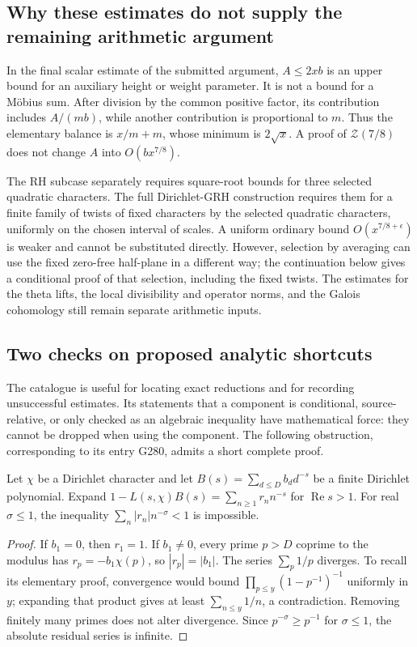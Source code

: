 \subsection{Why these estimates do not supply the remaining arithmetic argument}

In the final scalar estimate of the submitted argument,\cite{alpo-final-scalar}
$A\le2xb$ is an upper bound for an auxiliary height or
weight parameter. It is not a bound for a M\"obius sum.
After division by the common positive factor, its contribution
includes $A/(mb)$, while another contribution is proportional
to $m$. Thus the elementary balance is $x/m+m$, whose
minimum is $2\sqrt{x}$. A proof of
$\mathcal Z(7/8)$ does not change $A$ into
$O(bx^{7/8})$.

The RH subcase separately requires square-root bounds for
three selected quadratic characters. The full Dirichlet-GRH
construction requires them for a finite family of twists of
fixed characters by the selected quadratic characters, uniformly
on the chosen interval of scales. A uniform ordinary bound
$O(x^{7/8+\epsilon})$ is weaker and cannot be substituted
directly. However, selection by averaging can use the fixed
zero-free half-plane in a different way; the continuation below
gives a conditional proof of that selection, including the fixed
twists. The estimates for the theta lifts, the local divisibility
and operator norms, and the Galois cohomology still remain
separate arithmetic inputs.

\subsection{Two checks on proposed analytic shortcuts}

The catalogue is useful for locating exact reductions and
for recording unsuccessful estimates.\cite{qrh-catalogue} Its statements that
a component is conditional, source-relative, or only checked
as an algebraic inequality have mathematical force: they
cannot be dropped when using the component. The following
obstruction, corresponding to its entry G280, admits a
short complete proof.

\begin{proposition}
\label{prop:qrh-absolute-obstruction}
Let $\chi$ be a Dirichlet character and let
$B(s)=\sum_{d\le D}b_d d^{-s}$ be a finite Dirichlet
polynomial. Expand
$1-L(s,\chi)B(s)=\sum_{n\ge1}r_n n^{-s}$ for
$\operatorname{Re}s>1$. For real $\sigma\le1$, the
inequality $\sum_n|r_n|n^{-\sigma}<1$ is impossible.
\end{proposition}
\begin{proof}
If $b_1=0$, then $r_1=1$. If $b_1\ne0$, every prime
$p>D$ coprime to the modulus has
$r_p=-b_1\chi(p)$, so $|r_p|=|b_1|$.
The series $\sum_p1/p$ diverges. To recall its elementary
proof, convergence would bound
$\prod_{p\le y}(1-p^{-1})^{-1}$ uniformly in $y$;
expanding that product gives at least
$\sum_{n\le y}1/n$, a contradiction. Removing finitely
many primes does not alter divergence. Since
$p^{-\sigma}\ge p^{-1}$ for $\sigma\le1$, the
absolute residual series is infinite.
\end{proof}

